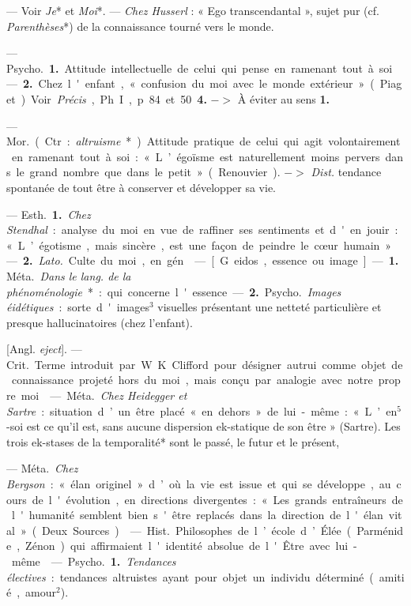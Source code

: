 \begin{itemize}[leftmargin=1cm, label=, itemsep=1pt]
 — Voir {\it Je}* et {\it Moi}*. — {\it Chez
Husserl} : « Ego transcendantal »,
sujet pur (cf. {\it Parenthèses}*) de la
connaissance tourné vers le monde.

 — \si{Psycho.} {\bf 1.} Attitude
intellectuelle de celui qui pense
en ramenant tout à soi. — {\bf 2.} Chez
l'enfant, « confusion du moi avec le
monde extérieur » (Piaget). Voir
 {\it Précis}, Ph. I, p. 84 et 50 {\bf 4.} $->$ À
éviter au sens {\bf 1.}

 — \si{Mor.} (Ctr. : {\it altruisme}*).
Attitude pratique de celui qui agit
volontairement en ramenant tout à
soi : « L’égoïsme est naturellement
moins pervers dans le grand nombre
que dans le petit » (Renouvier).
$->$ {\it Dist.} tendance spontanée de
tout être à conserver et développer
sa vie.

 — \si{Esth.} {\bf 1.} {\it Chez Stendhal} :
analyse du moi en vue de raffiner
ses sentiments et d'en jouir : « L’égotisme, mais sincère, est une façon de
peindre le cœur humain ». — {\bf 2.} {\it Lato.}
Culte du moi, en gén.

 — [G. eidos, essence ou image]
— {\bf 1.} \si{Méta.} {\it Dans le lang. de la phénoménologie}* :
qui concerne l'essence.
— {\bf 2.} \si{Psycho.} {\it Images éidétiques} :
sorte d'images$^3$ visuelles présentant
une netteté particulière et presque
hallucinatoires (chez l'enfant).

 [Angl. {\it eject}]. — \si{Crit.} Terme introduit par W. K.
Clifford pour désigner autrui comme objet de connaissance projeté hors
du moi, mais conçu par analogie avec notre propre moi.

 — \si{Méta.} {\it Chez Heidegger
et Sartre} : situation d’un être placé
« en dehors » de lui-même : « L’en$^5$-soi est ce qu'il est, sans aucune dispersion ek-statique de son être »
(Sartre). Les trois ek-stases de la
temporalité* sont le passé, le futur et le présent,

 — \si{Méta.} {\it Chez Bergson} :
« élan originel » d’où la vie est issue et qui se développe, au cours de
l'évolution, en directions divergentes : « Les grands entraîneurs de
l'humanité semblent bien s'être
replacés dans la direction de l'élan vital » (Deux Sources).

 — \si{Hist.} Philosophes de l’école
d’Élée (Parménide, Zénon) qui
affirmaient l'identité absolue de
l'Être avec lui-même.

 — \si{Psycho.} {\bf 1.} {\it Tendances électives} :
tendances altruistes ayant
pour objet un individu déterminé (amitié, amour$^2$).


\end{itemize}
